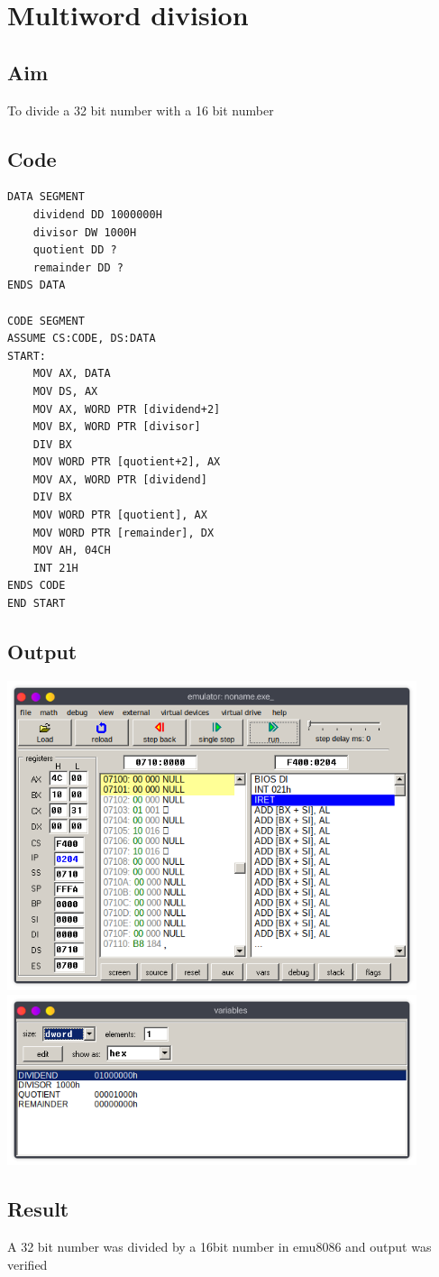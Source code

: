 \section{Multiword division}
\subsection{Aim}
To divide a 32 bit number with a 16 bit number

\subsection{Code}
\begin{lstlisting}
DATA SEGMENT
	dividend DD 1000000H
	divisor DW 1000H
	quotient DD ?
	remainder DD ?
ENDS DATA

CODE SEGMENT
ASSUME CS:CODE, DS:DATA 
START:
	MOV AX, DATA
	MOV DS, AX
	MOV AX, WORD PTR [dividend+2]
	MOV BX, WORD PTR [divisor]
	DIV BX
	MOV WORD PTR [quotient+2], AX
	MOV AX, WORD PTR [dividend]
	DIV BX
	MOV WORD PTR [quotient], AX
	MOV WORD PTR [remainder], DX
	MOV AH, 04CH
    INT 21H
ENDS CODE
END START
\end{lstlisting}

\subsection{Output}
\begin{center}
	\includegraphics[width=0.90\textwidth]{img/p6/ss1.png}
	\includegraphics[width=0.90\textwidth]{img/p6/ss2.png}
\end{center}

\subsection{Result}
A 32 bit number was divided by a 16bit number in emu8086 and output was verified